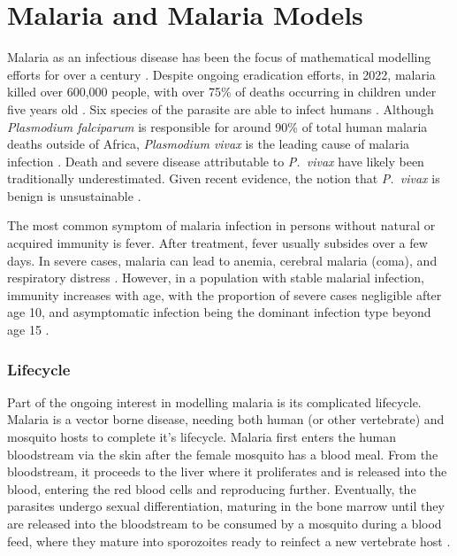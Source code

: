 \chapter{Malaria and Malaria Models}

Malaria as an infectious disease has been the focus of mathematical
modelling efforts for over a century \parencite{smith_ross_2012}.
Despite ongoing eradication efforts, in 2022,
malaria killed over 600,000 people, with over 75\% of deaths
occurring in children under five years old
\parencite{world_health_organization_world_2022}. Six
species of the parasite are able to infect humans
\parencite{milner_malaria_2018}. Although \textit{Plasmodium falciparum} is
responsible for around 90\% of total human malaria deaths outside of Africa,
\textit{Plasmodium vivax} is the leading cause of malaria infection
\parencite{zekar_plasmodium_2023, adams_biology_2017}.
Death and severe disease attributable to \textit{P.\ vivax}
have likely been traditionally underestimated. Given recent evidence, the
notion that \textit{P.\ vivax} is benign is unsustainable
\parencite{cowman_malaria_2016}.

The most common symptom of malaria infection in persons without natural or
acquired immunity is fever. After treatment, fever usually subsides over a
few days. In severe cases, malaria can lead to anemia, cerebral malaria (coma),
and respiratory distress \parencite{cowman_malaria_2016}. However,
in a population with stable malarial infection, immunity increases with age,
with the proportion of severe cases negligible after age 10, and asymptomatic
infection being the dominant infection type beyond age 15
\parencite{cowman_malaria_2016}.

\subsection*{Lifecycle}

Part of the ongoing interest in modelling malaria is its complicated lifecycle.
Malaria is a vector borne disease, needing both human (or other vertebrate) and
mosquito hosts to complete it's lifecycle. Malaria first
enters the human bloodstream via the skin after the
female mosquito has a blood meal. From the bloodstream, it proceeds to
the liver where it proliferates and is released into the blood, entering
the red blood cells and reproducing further. Eventually, the
parasites undergo sexual differentiation, maturing in the bone marrow
until they are
released into the bloodstream to be consumed by a mosquito during a blood feed,
where they mature into sporozoites ready to reinfect a new vertebrate host
\parencite{cowman_malaria_2016}.

